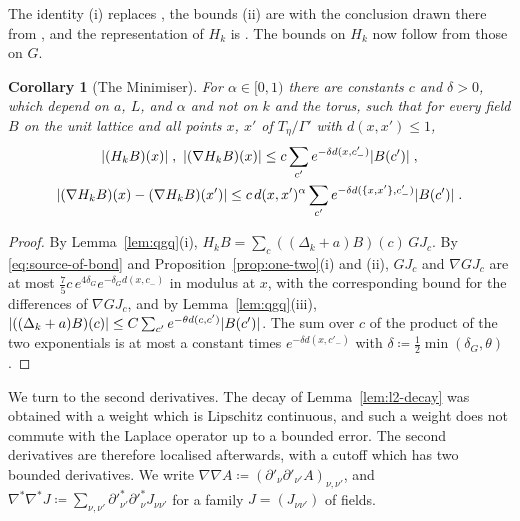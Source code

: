 \documentclass[11pt]{preprint}
\DeclarePairedDelimiter{\abs}{\lvert}{\rvert}
\numberwithin{equation}{section}
\newtheorem{corollary}[theorem]{Corollary}
\theoremstyle{definition}
\theoremstyle{remark}
\theoremstyle{plain}
\begin{document}
The identity (i) replaces \cite[(1.99)]{BalabanPRT1}, the bounds (ii) are \cite[(1.100)]{BalabanPRT1} with the conclusion drawn there from \cite[(1.101)]{BalabanPRT1}, and the representation of $H_k$ is \cite[(1.103)]{BalabanPRT1}. The bounds on $H_k$ now follow from those on $G$.

\begin{corollary}[The Minimiser]\label{cor:minimiser}
For $\alpha \in [0, 1)$ there are constants $c$ and $\delta > 0$, which depend on $a$, $L$, and $\alpha$ and not on $k$ and the torus, such that for every field $B$ on the unit lattice and all points $x$, $x'$ of $T_\eta/\Gamma'$ with $d(x, x') \leq 1$,
\begin{equation}\label{eq:minimiser-bounds}
\begin{gathered}
    \abs{(H_kB)(x)}\;,\ \abs{(\nabla H_kB)(x)} \leq c\sum_{c'}e^{-\delta d(x, c'_-)}\abs{B(c')}\;,\\
    \abs{(\nabla H_kB)(x) - (\nabla H_kB)(x')} \leq c\,d(x, x')^\alpha\sum_{c'}e^{-\delta d(\{ x, x' \}, c'_-)}\abs{B(c')}\;.
\end{gathered}
\end{equation}
\end{corollary}

\begin{proof}
By Lemma~\ref{lem:qgq}(i), $H_kB = \sum_c((\Delta_k + a)B)(c)\,GJ_c$. By \eqref{eq:source-of-bond} and Proposition~\ref{prop:one-two}(i) and (ii), $GJ_c$ and $\nabla GJ_c$ are at most $\frac75c\,e^{4\delta_G}e^{-\delta_Gd(x, c_-)}$ in modulus at $x$, with the corresponding bound for the differences of $\nabla GJ_c$, and by Lemma~\ref{lem:qgq}(iii), $\abs{((\Delta_k + a)B)(c)} \leq C\sum_{c'}e^{-\theta d(c, c')}\abs{B(c')}$. The sum over $c$ of the product of the two exponentials is at most a constant times $e^{-\delta d(x, c'_-)}$ with $\delta \coloneqq \frac12\min(\delta_G, \theta)$.
\end{proof}

We turn to the second derivatives. The decay of Lemma~\ref{lem:l2-decay} was obtained with a weight which is Lipschitz continuous, and such a weight does not commute with the Laplace operator up to a bounded error. The second derivatives are therefore localised afterwards, with a cutoff which has two bounded derivatives. We write $\nabla\nabla A \coloneqq (\partial'_\nu\partial'_{\nu'}A)_{\nu,\nu'}$, and $\nabla^*\nabla^*J \coloneqq \sum_{\nu,\nu'}\partial'^*_{\nu'}\partial'^*_\nu J_{\nu\nu'}$ for a family $J = (J_{\nu\nu'})$ of fields.
\end{document}
